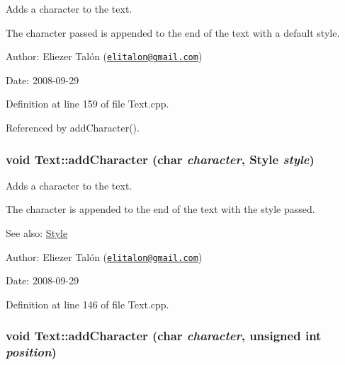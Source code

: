 Adds a character to the text. 

The character passed is appended to the end of the text with a default style.

\begin{Desc}
\item[Author:]Eliezer Talón (\href{mailto:elitalon@gmail.com}{\tt elitalon@gmail.com}) \end{Desc}
\begin{Desc}
\item[Date:]2008-09-29 \end{Desc}


Definition at line 159 of file Text.cpp.

Referenced by addCharacter().\hypertarget{class_text_757b9caa67089198ac99c06391b910bb}{
\subsubsection[addCharacter]{\setlength{\rightskip}{0pt plus 5cm}void Text::addCharacter (char {\em character}, \/  {\bf Style} {\em style})}}
\label{class_text_757b9caa67089198ac99c06391b910bb}


Adds a character to the text. 

The character is appended to the end of the text with the style passed.

\begin{Desc}
\item[See also:]\hyperlink{class_style}{Style}\end{Desc}
\begin{Desc}
\item[Author:]Eliezer Talón (\href{mailto:elitalon@gmail.com}{\tt elitalon@gmail.com}) \end{Desc}
\begin{Desc}
\item[Date:]2008-09-29 \end{Desc}


Definition at line 146 of file Text.cpp.\hypertarget{class_text_8e2f98d018b51a0b800bb1189ad7d9ae}{
\subsubsection[addCharacter]{\setlength{\rightskip}{0pt plus 5cm}void Text::addCharacter (char {\em character}, \/  unsigned int {\em position})}}
\label{class_text_8e2f98d018b51a0b800bb1189ad7d9ae}


